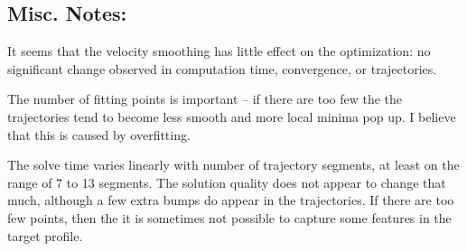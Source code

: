 \subsection{Misc. Notes:}

It seems that the velocity smoothing has little effect on the optimization: no significant
change observed in computation time, convergence, or trajectories.

The number of fitting points is important -- if there are too few the the trajectories tend to
become less smooth and more local minima pop up. I believe that this is caused by overfitting.

The solve time varies linearly with number of trajectory segments, at least on the range of 7 to 13 segments.
The solution quality does not appear to change that much, although a few extra bumps do appear in the trajectories.
If there are too few points, then the it is sometimes not possible to capture some features in the target profile.
